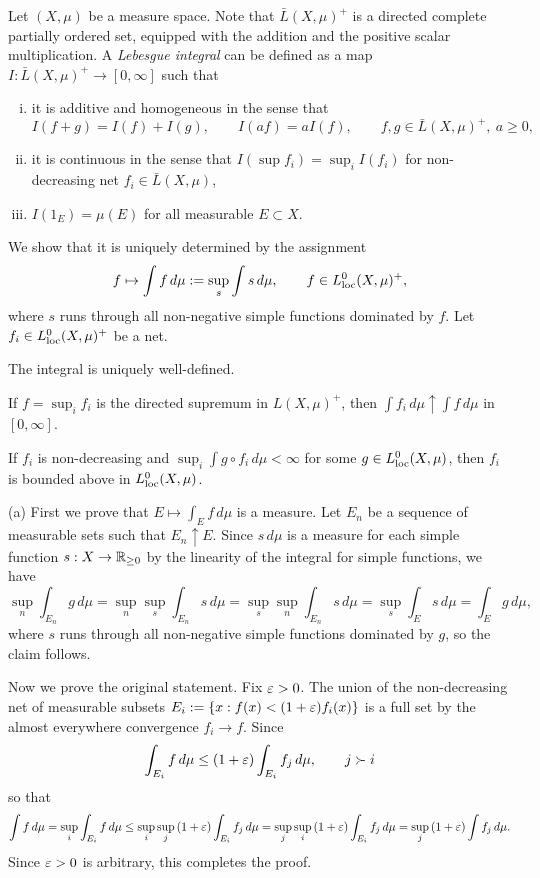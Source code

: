 \documentclass{../../large}
\begin{document}
\begin{prb}
Let $(X,\mu)$ be a measure space.
Note that $\bar L(X,\mu)^+$ is a directed complete partially ordered set, equipped with the addition and the positive scalar multiplication.
A \emph{Lebesgue integral} can be defined as a map $I:\bar L(X,\mu)^+\to[0,\infty]$ such that
\begin{enumerate}[(i)]
\item it is additive and homogeneous in the sense that
\[I(f+g)=I(f)+I(g),\qquad I(af)=aI(f),\qquad f,g\in\bar L(X,\mu)^+,\ a\ge0,\]
\item it is continuous in the sense that $I(\sup f_i)=\sup_iI(f_i)$ for non-decreasing net $f_i\in\bar L(X,\mu)$,
\item $I(1_E)=\mu(E)$ for all measurable $E\subset X$.
\end{enumerate}

We show that it is uniquely determined by the assignment
\[f\mapsto\int f\,d\mu:=\sup_s\int s\,d\mu,\qquad f\in L_{\mathrm{loc}}^0(X,\mu)^+,\]
where $s$ runs through all non-negative simple functions dominated by $f$.
Let $f_i\in L_{\mathrm{loc}}^0(X,\mu)^+$ be a net.
\begin{parts}
\item The integral is uniquely well-defined.
\item If $f=\sup_if_i$ is the directed supremum in $L(X,\mu)^+$, then $\int f_i\,d\mu\uparrow\int f\,d\mu$ in $[0,\infty]$.
\item If $f_i$ is non-decreasing and $\sup_i\int g\circ f_i\,d\mu<\infty$ for some $g\in L_{\mathrm{loc}}^0(X,\mu)$, then $f_i$ is bounded above in $L_{\mathrm{loc}}^0(X,\mu)$.
\end{parts}
\end{prb}
\begin{pf}
(a)
First we prove that $E\mapsto\int_Ef\,d\mu$ is a measure.
Let $E_n$ be a sequence of measurable sets such that $E_n\uparrow E$.
Since $s\,d\mu$ is a measure for each simple function $s:X\to\mathbb{R}_{\ge0}$ by the linearity of the integral for simple functions, we have
\[\sup_n\int_{E_n}g\,d\mu=\sup_n\sup_s\int_{E_n}s\,d\mu=\sup_s\sup_n\int_{E_n}s\,d\mu=\sup_s\int_Es\,d\mu=\int_Eg\,d\mu,\]
where $s$ runs through all non-negative simple functions dominated by $g$, so the claim follows.

Now we prove the original statement.
Fix $\varepsilon>0$.
The union of the non-decreasing net of measurable subsets $E_i:=\{x:f(x)<(1+\varepsilon)f_i(x)\}$ is a full set by the almost everywhere convergence $f_i\to f$.
Since
\[\int_{E_i}f\,d\mu\le(1+\varepsilon)\int_{E_i}f_j\,d\mu,\qquad j\succ i\]
so that
\[\int f\,d\mu=\sup_i\int_{E_i}f\,d\mu\le\sup_i\sup_j\,(1+\varepsilon)\int_{E_i}f_j\,d\mu=\sup_j\sup_i\,(1+\varepsilon)\int_{E_i}f_j\,d\mu=\sup_j\,(1+\varepsilon)\int f_j\,d\mu.\]
Since $\varepsilon>0$ is arbitrary, this completes the proof.


\end{pf}
\end{document}
